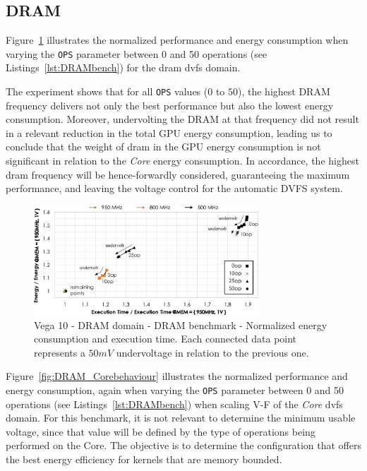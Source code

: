 \subsection{DRAM}

Figure~\ref{fig:DRAM_behaviour} illustrates the normalized performance and energy consumption when varying the \texttt{OPS} parameter between 0 and 50 operations (see Listings~\ref{lst:DRAMbench}) for the \acrshort{dram} \acrshort{dvfs} domain.

The experiment shows that for all \texttt{OPS} values ($0$ to $50$), the highest DRAM frequency delivers not only the best performance but also the lowest energy consumption. Moreover, undervolting the DRAM at that frequency did not result in a relevant reduction in the total GPU energy consumption, leading us to conclude that the weight of \acrshort{dram} in the GPU energy consumption is not significant in relation to the \textit{Core} energy consumption. In accordance, the highest \acrshort{dram} frequency will be hence-forwardly considered, guaranteeing the maximum performance, and leaving the voltage control for the automatic DVFS system.


\begin{figure}[htb]
  \centering
  \includegraphics[width=0.75\textwidth]{Figures/GPU_characterization/DRAM_behaviour.pdf}
  \caption{Vega 10 - DRAM domain - DRAM benchmark - Normalized energy consumption and execution time. Each connected data point represents a $50mV$ undervoltage in relation to the previous one.}
  \label{fig:DRAM_behaviour}
\end{figure}

Figure~\ref{fig:DRAM_Corebehaviour} illustrates the normalized performance and energy consumption, again when varying the \texttt{OPS} parameter between 0 and 50 operations (see Listings~\ref{lst:DRAMbench}) when scaling V-F of the \textit{Core} \acrshort{dvfs} domain. For this benchmark, it is not relevant to determine the minimum usable voltage, since that value will be defined by the type of operations being performed on the Core. The objective is to determine the configuration that offers the best energy efficiency for kernels that are memory bounded.  


